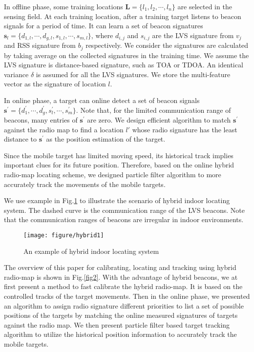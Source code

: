 \documentclass[conference, 10pt]{IEEEtran}
\begin{document}
In offline phase, some training locations $\mathbf{L}=\{l_{1}, l_{2}, \cdots, l_{n}\}$ are selected in the sensing field. At each training location, after a training target listens to beacon signals for a period of time. It can learn a set of beacon signatures $\mathbf{s}_{l}=\{d_{1,l}, \cdots, d_{g,l}, s_{1,l}, \cdots, s_{m,l}\}$, where $d_{i,j}$ and $s_{i,j}$ are the LVS signature from $v_{j}$ and RSS signature from $b_{j}$ respectively.  We consider the signatures are calculated by taking average on the collected signatures in the training time. We assume the LVS signature is distance-based signature, such as TOA or TDOA. An identical variance $\delta$ is assumed for all the LVS signatures. We store the multi-feature vector as the signature of location $l$. 

In online phase, a target can online detect a set of beacon signals $\mathbf{s}^{'}=\{d_{1}^{'}, \cdots, d_{g}^{'}, s_{l}^{'}, \cdots, s_{m}^{'}\}$.  Note that, for the limited communication range of beacons, many entries of $\mathbf{s}^{'}$ are zero. We design efficient algorithm to match $\mathbf{s}^{'}$ against the radio map to find a location $l'$ whose radio signature has the least distance to  $\mathbf{s}^{'}$ as the position estimation of the target. 

Since the mobile target has limited moving speed, its historical track implies important clues for its future position. Therefore, based on the online hybrid radio-map locating scheme, we designed particle filter algorithm to more accurately track the movements of the mobile targets. 

 
We use example in Fig.\ref{fig1} to illustrate the scenario of  hybrid indoor locating system.  The dashed curve is the communication range of the LVS beacons. Note that the communication ranges of beacons are irregular in indoor environments. 
\begin{figure}[t]
\begin{center}
\texttt{[image: figure/hybrid1]}
\caption{An example of hybrid indoor locating system}
\label{fig1}
\end{center}
\end{figure}

The overview of this paper for calibrating, locating and tracking using hybrid radio-map is shown in Fig.\ref{fig2}.  With the advantage of hybrid beacons, we at first present a method to fast calibrate the hybrid radio-map. It is based on the controlled tracks of the target movements. Then in the online phase, we presented an algorithm to assign radio signature different priorities to list a set of possible positions of the targets by matching the online measured signatures of targets against the radio map. We then present particle filter based target tracking algorithm to utilize the historical position information to accurately track the mobile targets.  
\end{document}
